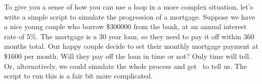 To give you a sense of how you can use a loop in a more complex situation, let's write a simple script to simulate the progression of a mortgage. Suppose we have a nice young couple who borrow \$300000 from the bank, at an annual interest rate of 5\%. The mortgage is a 30 year loan, so they need to pay it off within 360 months total. Our happy couple decide to set their monthly mortgage payment at \$1600 per month. Will they pay off the loan in time or not? Only time will tell. Or, alternatively, we could simulate the whole process and get \R\ to tell us. The script to run this is a fair bit more complicated. 

